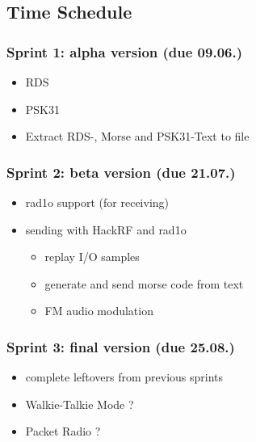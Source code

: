 \subsection{Time Schedule}

\subsubsection{Sprint 1: alpha version (due 09.06.)}
\begin{itemize}
	\item RDS
	\item PSK31
	\item Extract RDS-, Morse and PSK31-Text to file
\end{itemize}

\subsubsection{Sprint 2: beta version (due 21.07.)}
\begin{itemize}
	\item rad1o support (for receiving)
	\item sending with HackRF and rad1o
	\begin{itemize}
		\item replay I/O samples
		\item generate and send morse code from text
		\item FM audio modulation
	\end{itemize}
\end{itemize}

\subsubsection{Sprint 3: final version (due 25.08.)}
\begin{itemize}
	\item complete leftovers from previous sprints
	\item Walkie-Talkie Mode ?
	\item Packet Radio ?
\end{itemize}



%
